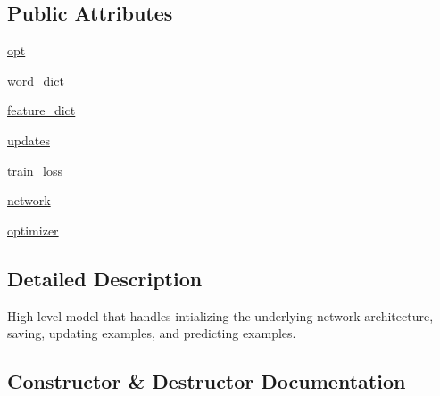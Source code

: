 \subsection*{Public Attributes}
\begin{DoxyCompactItemize}
\item 
\hyperlink{classparlai_1_1agents_1_1drqa_1_1model_1_1DocReaderModel_ae6b1a15378e076ef66f15bf4183f8d69}{opt}
\item 
\hyperlink{classparlai_1_1agents_1_1drqa_1_1model_1_1DocReaderModel_a2c53c78892ade8ebd82cb581608d58dd}{word\+\_\+dict}
\item 
\hyperlink{classparlai_1_1agents_1_1drqa_1_1model_1_1DocReaderModel_a89edfda425c66170c166156d5f3e8a18}{feature\+\_\+dict}
\item 
\hyperlink{classparlai_1_1agents_1_1drqa_1_1model_1_1DocReaderModel_aa614f2c9cef3332b2af7a48552820f17}{updates}
\item 
\hyperlink{classparlai_1_1agents_1_1drqa_1_1model_1_1DocReaderModel_aaea517209501c80d5d8b86fa666c8dc6}{train\+\_\+loss}
\item 
\hyperlink{classparlai_1_1agents_1_1drqa_1_1model_1_1DocReaderModel_a2c06172550232ff17fa3b6538c1b3d55}{network}
\item 
\hyperlink{classparlai_1_1agents_1_1drqa_1_1model_1_1DocReaderModel_a97fe699cd31edef437716191498eedd9}{optimizer}
\end{DoxyCompactItemize}


\subsection{Detailed Description}
\begin{DoxyVerb}High level model that handles intializing the underlying network architecture,
saving, updating examples, and predicting examples.
\end{DoxyVerb}
 

\subsection{Constructor \& Destructor Documentation}
\mbox{\label{classparlai_1_1agents_1_1drqa_1_1model_1_1DocReaderModel_ab669b8ef6f50f9c6d81f3544c42727e9}} 
